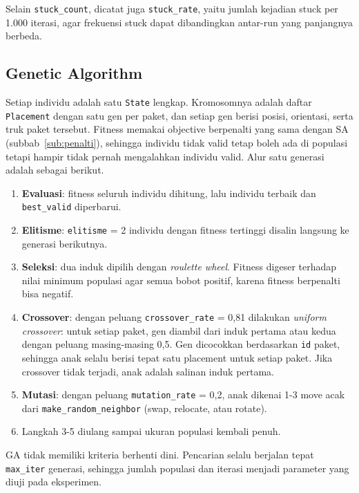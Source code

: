 \documentclass[12pt,a4paper]{report}
\newcommand{\code}[1]{\texttt{\small #1}}
\begin{document}
Selain \code{stuck\_count}, dicatat juga \code{stuck\_rate}, yaitu jumlah kejadian stuck per
1.000 iterasi, agar frekuensi stuck dapat dibandingkan antar-run yang panjangnya berbeda.

\subsection{Genetic Algorithm}
Setiap individu adalah satu \code{State} lengkap. Kromosomnya adalah daftar \code{Placement}
dengan satu gen per paket, dan setiap gen berisi posisi, orientasi, serta truk paket tersebut.
Fitness memakai objective berpenalti yang sama dengan SA (subbab~\ref{sub:penalti}), sehingga
individu tidak valid tetap boleh ada di populasi tetapi hampir tidak pernah mengalahkan individu
valid. Alur satu generasi adalah sebagai berikut.
\begin{enumerate}[leftmargin=1.5cm]
  \item \textbf{Evaluasi}: fitness seluruh individu dihitung, lalu individu terbaik dan
        \code{best\_valid} diperbarui.
  \item \textbf{Elitisme}: \code{elitisme} = 2 individu dengan fitness tertinggi disalin langsung ke
        generasi berikutnya.
  \item \textbf{Seleksi}: dua induk dipilih dengan \textit{roulette wheel}. Fitness digeser terhadap
        nilai minimum populasi agar semua bobot positif, karena fitness berpenalti bisa negatif.
  \item \textbf{Crossover}: dengan peluang \code{crossover\_rate} = 0,81 dilakukan
        \textit{uniform crossover}: untuk setiap paket, gen diambil dari induk pertama atau kedua
        dengan peluang masing-masing 0,5. Gen dicocokkan berdasarkan \code{id} paket, sehingga anak
        selalu berisi tepat satu placement untuk setiap paket. Jika crossover tidak terjadi, anak
        adalah salinan induk pertama.
  \item \textbf{Mutasi}: dengan peluang \code{mutation\_rate} = 0,2, anak dikenai 1-3 move acak dari
        \code{make\_random\_neighbor} (swap, relocate, atau rotate).
  \item Langkah 3-5 diulang sampai ukuran populasi kembali penuh.
\end{enumerate}

GA tidak memiliki kriteria berhenti dini. Pencarian selalu berjalan tepat \code{max\_iter}
generasi, sehingga jumlah populasi dan iterasi menjadi parameter yang diuji pada eksperimen.
\end{document}
